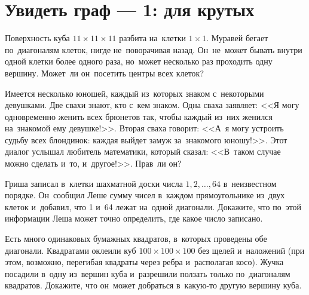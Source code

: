 
\section*{Увидеть граф --- 1: для крутых}




\begin{problems}

Поверхность куба $11 \times 11 \times 11$ разбита на~клетки $1 \times 1$.
Муравей бегает по~диагоналям клеток, нигде не~поворачивая назад.
Он~не~может бывать внутри одной клетки более одного раза, но~может несколько
раз проходить одну вершину.
Может~ли он~посетить центры всех клеток?

Имеется несколько юношей, каждый из~которых знаком с~некоторыми девушками.
Две свахи знают, кто с~кем знаком.
Одна сваха заявляет:
<<Я могу одновременно женить всех брюнетов так, чтобы каждый из~них женился
на~знакомой ему девушке!>>.
Вторая сваха говорит:
<<А~я могу устроить судьбу всех блондинок: каждая выйдет замуж за~знакомого
юношу!>>.
Этот диалог услышал любитель математики, который сказал:
<<В~таком случае можно сделать и~то, и~другое!>>.
Прав~ли он?

Гриша записал в~клетки шахматной доски числа $1, 2, \ldots, 64$ в~неизвестном
порядке.
Он~сообщил Леше сумму чисел в~каждом прямоугольнике из~двух клеток и~добавил,
что 1 и~64 лежат на~одной диагонали.
Докажите, что по~этой информации Леша может точно определить, где какое число
записано.

Есть много одинаковых бумажных квадратов, в~которых проведены обе диагонали.
Квадратами оклеили куб $100 \times 100 \times 100$ без щелей и~наложений
(при этом, возможно, перегибая квадраты через ребра и~располагая косо).
Жучка посадили в~одну из~вершин куба и~разрешили ползать только по~диагоналям
квадратов.
Докажите, что он~может добраться в~какую-то другую вершину куба.

\end{problems}

